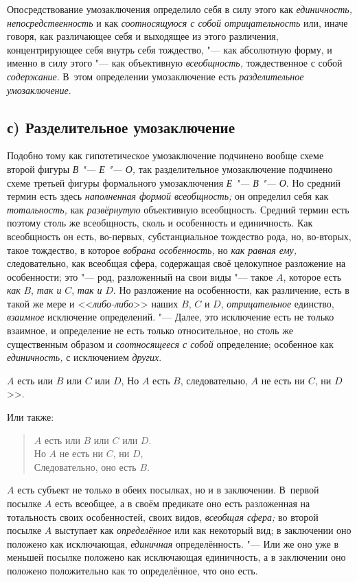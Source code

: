 Опосредствование умозаключения определило себя в силу этого
как {\em единичность, непосредственность} и
как {\em соотносящуюся с собой
отрицательность} или, иначе говоря, как различающее себя и
выходящее из этого различения, концентрирующее себя внутрь себя тождество,
"--- как абсолютную форму, и именно в силу этого "--- как объективную
{\em всеобщность,} тождественное с собой {\em содержание}. В~этом
определении умозаключение есть {\em разделительное умозаключение}.

\subsection[с) Разделительное умозаключение]{с) Разделительное умозаключение}

Подобно тому как гипотетическое умозаключение подчинено вообще
схеме второй фигуры {\em В "--- Е "--- О,} так разделительное
умозаключение подчинено схеме третьей фигуры формального умозаключения
{\em Е "--- В "--- О}. Но средний термин есть здесь
{\em наполненная формой всеобщность;}
он определил себя как {\em тотальность,} как {\em развёрнутую}
объективную всеобщность. Средний термин есть поэтому столь же
всеобщность, сколь и особенность и единичность. Как всеобщность он есть,
во-первых, субстанциальное тождество рода, но, во-вторых, такое тождество,
в которое {\em вобрана особенность,} но {\em как равная ему,}
следовательно, как всеобщая сфера, содержащая своё целокупное
разложение на особенности; это "--- род, разложенный на свои
виды "--- такое $A$,
которое есть {\em как} $B$, {\em так и} $C$, {\em так и} $D$. Но
разложение на особенности, как различение, есть в такой же мере и
<<{\em либо-либо}>> наших $B$, $C$ и $D$, {\em отрицательное}
единство, {\em взаимное} исключение определений. "--- Далее, это
исключение есть не только взаимное, и определение не есть только
относительное, но столь же существенным образом и {\em соотносящееся с собой}
определение; особенное как {\em единичность,} с исключением {\em других}.

$A$ есть или $B$ или $C$ или $D$,
Но $A$ есть $B$, следовательно, $A$ не есть ни $C$, ни $D$>>.

Или также:

\begin{verse}
$A$ есть или $B$ или $C$ или $D$.\\
Но $A$ не есть ни $C$, ни $D$,\\
Следовательно, оно есть $B$.
\end{verse}

$A$ есть субъект не только в обеих посылках, но и в заключении.
В~первой посылке $A$ есть всеобщее, а
в своём предикате оно есть разложенная на тотальность своих особенностей,
своих видов, {\em всеобщая сфера;} во второй посылке $A$
выступает как {\em определённое} или
как некоторый вид; в заключении оно положено как исключающая, {\em единичная}
определённость. "--- Или же оно уже в меньшей
посылке положено как исключающая единичность, а в заключении оно положено
положительно как то определённое, что оно есть.

